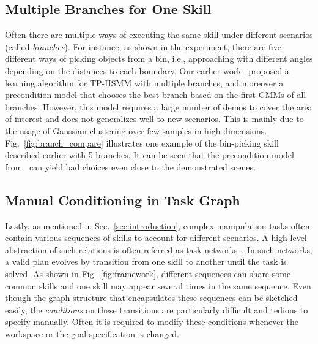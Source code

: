 \subsection{Multiple Branches for One Skill}\label{subsec:limit-branch}
Often there are multiple ways of executing the same skill under different scenarios (called \emph{branches}).
For instance, as shown in the experiment, there are five different ways of picking objects from a bin, i.e., approaching with different angles depending on the distances to each boundary.  
Our earlier work~\cite{rozo2020learning} proposed a learning algorithm for TP-HSMM with multiple branches, 
and moreover a precondition model that chooses the best branch based on the first GMMs of all branches.
However, this model requires a large number of demos to cover the area of interest 
and does not generalizes well to new scenarios.
This is mainly due to the usage of Gaussian clustering over few samples in high dimensions. 
Fig.~\ref{fig:branch_compare} illustrates one example of the bin-picking skill described earlier with 5 branches.
It can be seen that the precondition model from~\cite{rozo2020learning} can yield bad choices even close to the demonstrated scenes. 

\subsection{Manual Conditioning in Task Graph}\label{subsec:manual-specification}
Lastly, as mentioned in Sec.~\ref{sec:introduction}, complex manipulation tasks often contain various sequences of skills to account for different scenarios. 
A high-level abstraction of such relations is often referred as task networks~\cite{hayes2016autonomously}.
In such networks, a valid plan evolves by transition from one skill to another until the task is solved. 
As shown in Fig.~\ref{fig:framework}, different sequences can share some common skills and one skill may appear several times in the same sequence. 
Even though the graph structure that encapsulates these sequences can be sketched easily, 
the \emph{conditions} on these transitions are particularly difficult and tedious to specify manually. 
Often it is required to modify these conditions whenever the workspace or the goal specification is changed. 

